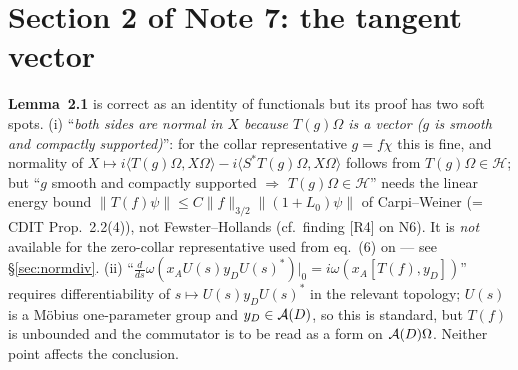\documentclass[11pt]{article}
\begin{document}
\section{Section 2 of Note 7: the tangent vector}\label{sec:tangent}

\begin{verdictgap}
\textbf{Lemma~2.1} is correct as an identity of functionals but its proof has two soft spots.
(i) ``\emph{both sides are normal in $X$ because $T(g)\Omega$ is a vector ($g$ is smooth and compactly
supported)}'': for the collar representative $g=f\chi$ this is fine, and normality of
$X\mapsto i\langle T(g)\Omega,X\Omega\rangle-i\langle S^*T(g)\Omega,X\Omega\rangle$ follows from
$T(g)\Omega\in\mathcal H$; but ``$g$ smooth and compactly supported $\Rightarrow$ $T(g)\Omega\in\mathcal H$''
needs the linear energy bound $\|T(f)\psi\|\le C\|f\|_{3/2}\|(1+L_0)\psi\|$ of Carpi--Weiner (= CDIT
Prop.~2.2(4)), not Fewster--Hollands (cf.\ finding [R4] on N6).  It is \emph{not} available for the zero-collar
representative used from eq.~(6) on --- see \S\ref{sec:normdiv}.
(ii) ``$\frac d{ds}\omega(x_AU(s)y_DU(s)^*)|_0=i\omega(x_A[T(f),y_D])$'' requires differentiability of
$s\mapsto U(s)y_DU(s)^*$ in the relevant topology; $U(s)$ is a M\"obius one-parameter group and $y_D\in\mathcal A(D)$,
so this is standard, but $T(f)$ is unbounded and the commutator is to be read as a form on $\mathcal A(D)\Omega$.
Neither point affects the conclusion.
\end{verdictgap}
\end{document}
